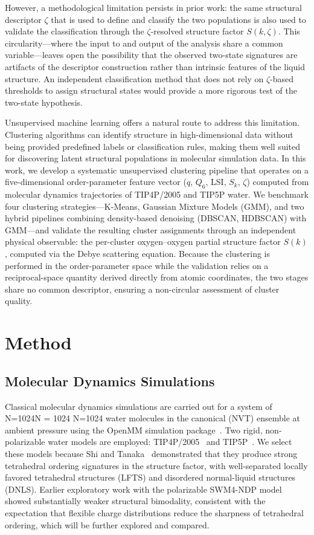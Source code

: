 \documentclass[aps, amsmath,amssymb, reprint, onecolumn,notitlepage,superscriptaddress]{revtex4-2}
\begin{document}
However, a methodological limitation persists in prior work: the same structural descriptor $\zeta$ that is used to define and classify the two populations is also used to validate the classification through the
$\zeta$-resolved structure factor $S(k, \zeta)$. This circularity---where the input to and output of the analysis share a common variable---leaves open the possibility that the observed two-state signatures are artifacts of the descriptor construction rather than intrinsic features of the liquid structure. An independent classification method that does not rely on $\zeta$-based thresholds to assign structural states would provide a more rigorous test of the two-state hypothesis.

Unsupervised machine learning offers a natural route to address this limitation. Clustering algorithms can identify structure in high-dimensional data without being provided predefined labels or classification rules, making them well suited for discovering latent structural populations in molecular simulation data. In this work, we develop a systematic unsupervised clustering pipeline that operates on a
five-dimensional order-parameter feature vector ($q$, $Q_6$, LSI, $S_k$, $\zeta$) computed from molecular dynamics trajectories of TIP4P/2005 and TIP5P water. We benchmark four clustering strategies---K-Means, Gaussian Mixture Models (GMM), and two hybrid pipelines combining density-based denoising (DBSCAN,
HDBSCAN) with GMM---and validate the resulting cluster assignments through an independent physical observable: the per-cluster oxygen--oxygen partial structure factor $S(k)$, computed via the Debye scattering equation. Because the clustering is performed in the order-parameter space while the validation relies on a reciprocal-space quantity derived directly from atomic coordinates, the two stages share no common descriptor, ensuring a non-circular assessment of cluster quality.

\section{Method}
\subsection{Molecular Dynamics Simulations}
Classical molecular dynamics simulations are carried out for a system of N=1024N = 1024
N=1024 water molecules in the canonical (NVT) ensemble at ambient pressure using the OpenMM simulation package~\cite{eastman_openmm_2015}.  Two rigid, non-polarizable water models are employed: TIP4P/2005~\cite{abascal_general_2005} and TIP5P~\cite{mahoney_five-site_2000}. We select these models because Shi and Tanaka~\cite{shi_direct_2020} demonstrated that they produce strong tetrahedral ordering signatures in the structure factor, with well-separated locally favored tetrahedral structures (LFTS) and disordered normal-liquid structures (DNLS). Earlier exploratory work with the polarizable SWM4-NDP model showed substantially weaker structural bimodality, consistent with the expectation that flexible charge distributions reduce the sharpness of tetrahedral ordering, which will be further explored and compared.
\end{document}
